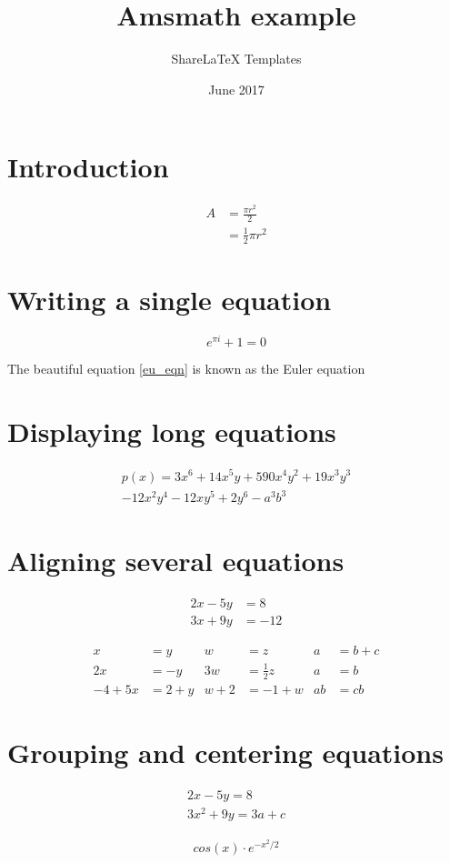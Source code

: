 \documentclass{article}
\title{Amsmath example}
\author{ShareLaTeX Templates}
\date{June 2017}
\begin{document}
\maketitle
\section{Introduction}

\begin{equation} \label{eq1}
\begin{split}
A & = \frac{\pi r^2}{2} \\
 & = \frac{1}{2} \pi r^2
\end{split}
\end{equation}

\section{Writing a single equation}

\begin{equation} \label{eu_eqn}
e^{\pi i} + 1 = 0
\end{equation}
 
The beautiful equation \ref{eu_eqn} is known as the Euler equation

\section{Displaying long equations}

\begin{multline*}
p(x) = 3x^6 + 14x^5y + 590x^4y^2 + 19x^3y^3\\ 
- 12x^2y^4 - 12xy^5 + 2y^6 - a^3b^3
\end{multline*}

\section{Aligning several equations}

\begin{align*} 
2x - 5y &=  8 \\ 
3x + 9y &=  -12
\end{align*}

\begin{align*}
x&=y           &  w &=z              &  a&=b+c\\
2x&=-y         &  3w&=\frac{1}{2}z   &  a&=b\\
-4 + 5x&=2+y   &  w+2&=-1+w          &  ab&=cb
\end{align*}

\section{Grouping and centering equations}

\begin{gather*} 
2x - 5y =  8 \\ 
3x^2 + 9y =  3a + c
\end{gather*}

\begin{align*}
    cos(x) \cdot e^{- x^2 / 2}
\end{align*}
\end{document}
